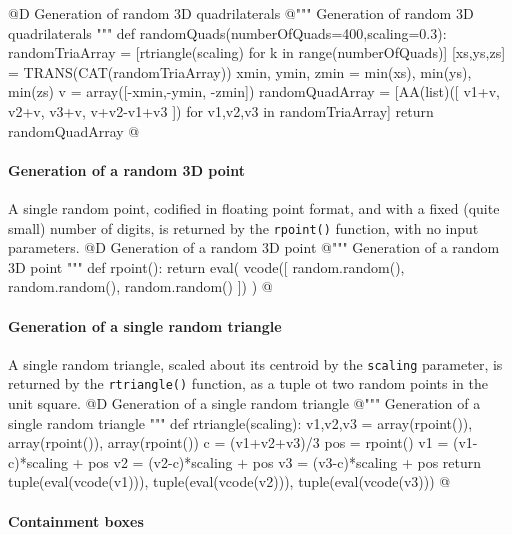 \documentclass[11pt,oneside]{article}    %
\begin{document}
@D Generation of random 3D quadrilaterals
@{""" Generation of random 3D quadrilaterals """
def randomQuads(numberOfQuads=400,scaling=0.3):
    randomTriaArray = [rtriangle(scaling) for k in range(numberOfQuads)]
    [xs,ys,zs] = TRANS(CAT(randomTriaArray))
    xmin, ymin, zmin = min(xs), min(ys), min(zs)
    v = array([-xmin,-ymin, -zmin])
    randomQuadArray = [AA(list)([ v1+v, v2+v, v3+v, v+v2-v1+v3 ]) for v1,v2,v3 in randomTriaArray]
    return randomQuadArray
@}


\paragraph{Generation of a random 3D point}
A single random point, codified in floating point format, and with a fixed (quite small) number of digits, is returned by the \texttt{rpoint()} function, with no input parameters.
@D Generation of a random 3D point
@{""" Generation of a random 3D point """
def rpoint():
    return eval( vcode([ random.random(), random.random(), random.random() ]) )
@}
    
\paragraph{Generation of a single random triangle}
A single random triangle, scaled about its centroid by the \texttt{scaling} parameter, is returned by the \texttt{rtriangle()} function, as a tuple ot two random points in the unit square.
@D Generation of a single random triangle
@{""" Generation of a single random triangle """
def rtriangle(scaling):
    v1,v2,v3 = array(rpoint()), array(rpoint()), array(rpoint())
    c = (v1+v2+v3)/3
    pos = rpoint()
    v1 = (v1-c)*scaling + pos
    v2 = (v2-c)*scaling + pos
    v3 = (v3-c)*scaling + pos
    return tuple(eval(vcode(v1))), tuple(eval(vcode(v2))), tuple(eval(vcode(v3)))
@}
    

\paragraph{Containment boxes}
\end{document}
